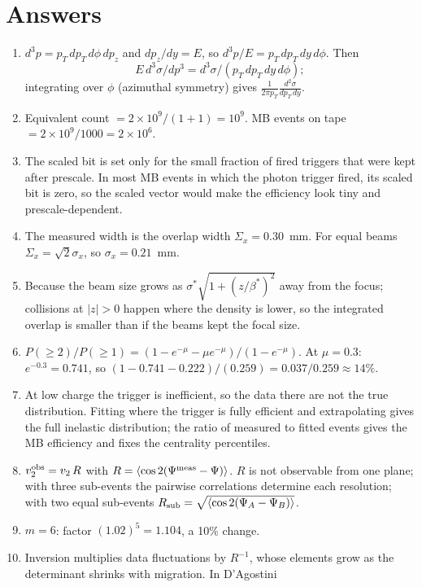 \documentclass[11pt,letterpaper]{article}
\begin{document}
\appendix
\section{Answers}\label{app:answers}
\begin{enumerate}
\item $d^3p=p_T\,dp_T\,d\phi\,dp_z$ and $dp_z/dy=E$, so $d^3p/E=p_T\,dp_T\,dy\,d\phi$. Then
\[E\,d^3\sigma/dp^3=d^3\sigma/(p_T\,dp_T\,dy\,d\phi);\]
integrating over $\phi$ (azimuthal symmetry) gives $\frac{1}{2\pi p_T}\frac{d^2\sigma}{dp_T\,dy}$.
\item Equivalent count $=2\times10^9/(1+1)=10^9$. MB events on tape $=2\times10^9/1000=2\times10^6$.
\item The scaled bit is set only for the small fraction of fired triggers that were kept after prescale. In most MB events in which the
photon trigger fired, its scaled bit is zero, so the scaled vector would make the efficiency look tiny and prescale-dependent.
\item The measured width is the overlap width $\Sigma_x=0.30$~mm. For equal beams $\Sigma_x=\sqrt2\sigma_x$, so $\sigma_x=0.21$~mm.
\item Because the beam size grows as $\sigma^*\sqrt{1+(z/\beta^*)^2}$ away from the focus; collisions at $|z|>0$ happen where the
density is lower, so the integrated overlap is smaller than if the beams kept the focal size.
\item $P(\ge2)/P(\ge1)=(1-e^{-\mu}-\mu e^{-\mu})/(1-e^{-\mu})$. At $\mu=0.3$: $e^{-0.3}=0.741$, so $(1-0.741-0.222)/(0.259)=0.037/0.259\approx14\%$.
\item At low charge the trigger is inefficient, so the data there are not the true distribution. Fitting where the trigger is fully
efficient and extrapolating gives the full inelastic distribution; the ratio of measured to fitted events gives the MB efficiency and
fixes the centrality percentiles.
\item $v_2^{\rm obs}=v_2\,R$ with $R=\langle\cos2(\Psi^{\rm meas}-\Psi)\rangle$. $R$ is not observable from one plane; with three
sub-events the pairwise correlations determine each resolution; with two equal sub-events $R_{\rm sub}=\sqrt{\langle\cos2(\Psi_A-\Psi_B)\rangle}$.
\item $m=6$: factor $(1.02)^{5}=1.104$, a 10\% change.
\item Inversion multiplies data fluctuations by $R^{-1}$, whose elements grow as the determinant shrinks with migration. In D'Agostini

\end{enumerate}
\end{document}
